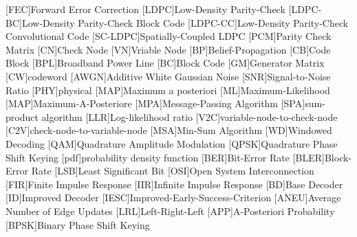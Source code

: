 \begin{acronym}
  [FEC]{Forward Error Correction}
  [LDPC]{Low-Density Parity-Check}
  [LDPC-BC]{Low-Density Parity-Check Block Code}
  [LDPC-CC]{Low-Density Parity-Check Convolutional Code}
  [SC-LDPC]{Spatially-Coupled LDPC}
  [PCM]{Parity Check Matrix}
  [CN]{Check Node}
  [VN]{Vriable Node}
  [BP]{Belief-Propagation}
  [CB]{Code Block}
  [BPL]{Broadband Power Line}
  [BC]{Block Code}
  [GM]{Generator Matrix}
  [CW]{codeword}
  [AWGN]{Additive White Gaussian Noise}
  [SNR]{Signal-to-Noise Ratio}
  [PHY]{physical}
  [MAP]{Maximum a posteriori}
  [ML]{Maximum-Likelihood}
  [MAP]{Maximum-A-Posteriore}
  [MPA]{Message-Passing Algorithm}
  [SPA]{sum-product algorithm}
  [LLR]{Log-likelihood ratio}
  [V2C]{variable-node-to-check-node}
  [C2V]{check-node-to-variable-node}
  [MSA]{Min-Sum Algorithm}
  [WD]{Windowed Decoding}
  [QAM]{Quadrature Amplitude Modulation}
  [QPSK]{Quadrature Phase Shift Keying}
  [pdf]{probability density function}
  [BER]{Bit-Error Rate}
  [BLER]{Block-Error Rate}
  [LSB]{Least Significant Bit}
  [OSI]{Open System Interconnection}
  [FIR]{Finite Impulse Response}
  [IIR]{Infinite Impulse Response}
  [BD]{Base Decoder}
  [ID]{Improved Decoder}
  [IESC]{Improved-Early-Success-Criterion}
  [ANEU]{Average Number of Edge Updates}
  [LRL]{Left-Right-Left}
  [APP]{A-Posteriori Probability}
  [BPSK]{Binary Phase Shift Keying}
\end{acronym}
